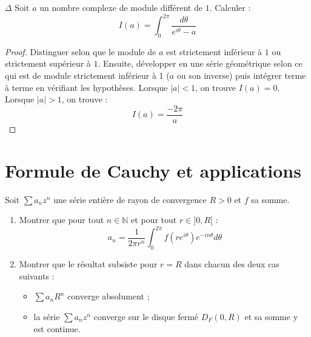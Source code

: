 \documentclass[french,a4paper]{article}
\newcommand{\N}{\mathbb{N}}
\theoremstyle{plain}
\theoremstyle{definition}
\theoremstyle{remark}
\begin{document}
\begin{ex}[Moulin.SE.30]{$\Delta$}
	Soit $a$ un nombre complexe de module différent de $1$. Calculer : $$I(a)=\int_{0}^{2\pi}\frac{d\theta}{e^{i\theta}-a}$$
\end{ex}
\begin{proof}
	Distinguer selon que le module de $a$ est strictement inférieur à $1$ ou strictement supérieur à $1$. Ensuite, développer en une série géométrique selon ce qui est de module strictement inférieur à 1 ($a$ ou son inverse) puis intégrer terme à terme en vérifiant les hypothèses. Lorsque $\lvert a\rvert <1$, on trouve $I(a)=0$. Lorsque $\lvert a\rvert >1$, on trouve : $$I(a)=\frac{-2\pi}{a}$$
\end{proof}

\section{Formule de Cauchy et applications}

\begin{ex}[Moulin.SE.31]{}
	Soit $\displaystyle\sum a_nz^n$ une série entière de rayon de convergence $R>0$ et $f$ sa somme.
	\begin{enumerate}
		\item Montrer que pour tout $n\in\N$ et pour tout $r\in]0,R[$ : $$a_n=\frac{1}{2\pi r^n}\int_{0}^{2\pi}f(re^{i\theta})e^{-in\theta}d\theta$$
		\item Montrer que le résultat subsiste pour $r=R$ dans chacun des deux cas suivants : 
		\begin{itemize}
			\item $\displaystyle\sum a_n R^n$ converge absolument ;
			\item la série $\displaystyle\sum a_nz^n$ converge sur le disque fermé $D_F(0,R)$ et sa somme y est continue.
		\end{itemize}
	\end{enumerate}
\end{ex}
\end{document}
